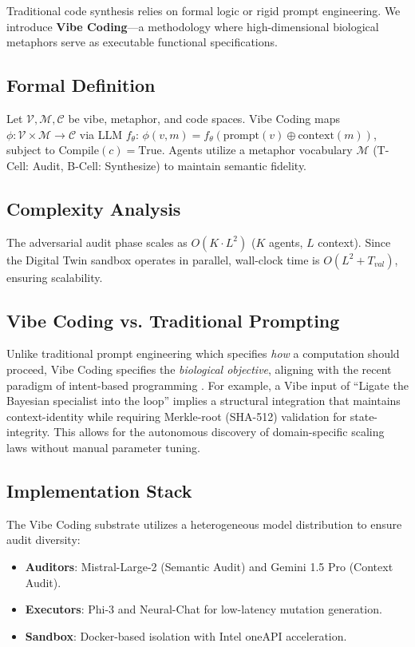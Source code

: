 Traditional code synthesis relies on formal logic or rigid prompt engineering. We introduce \textbf{Vibe Coding}---a methodology where high-dimensional biological metaphors serve as executable functional specifications.

\subsection{Formal Definition}
Let $\mathcal{V}, \mathcal{M}, \mathcal{C}$ be vibe, metaphor, and code spaces. Vibe Coding maps $\phi: \mathcal{V} \times \mathcal{M} \rightarrow \mathcal{C}$ via LLM $f_{\theta}$: $\phi(v, m) = f_{\theta}(\text{prompt}(v) \oplus \text{context}(m))$, subject to $\text{Compile}(c) = \text{True}$. Agents utilize a metaphor vocabulary $\mathcal{M}$ (T-Cell: Audit, B-Cell: Synthesize) to maintain semantic fidelity.

\subsection{Complexity Analysis}
The adversarial audit phase scales as $O(K \cdot L^2)$ ($K$ agents, $L$ context). Since the Digital Twin sandbox operates in parallel, wall-clock time is $O(L^2 + T_{val})$, ensuring scalability.

\subsection{Vibe Coding vs. Traditional Prompting}
Unlike traditional prompt engineering which specifies \textit{how} a computation should proceed, Vibe Coding specifies the \textit{biological objective}, aligning with the recent paradigm of intent-based programming \cite{karpathy2025vibecoding, sorensen2024vibe}. For example, a Vibe input of ``Ligate the Bayesian specialist into the loop'' implies a structural integration that maintains context-identity while requiring Merkle-root (SHA-512) validation for state-integrity. This allows for the autonomous discovery of domain-specific scaling laws \cite{lewis2022scaling} without manual parameter tuning.

\subsection{Implementation Stack}
The Vibe Coding substrate utilizes a heterogeneous model distribution to ensure audit diversity:
\begin{itemize}
    \item \textbf{Auditors}: Mistral-Large-2 (Semantic Audit) and Gemini 1.5 Pro (Context Audit).
    \item \textbf{Executors}: Phi-3 and Neural-Chat for low-latency mutation generation.
    \item \textbf{Sandbox}: Docker-based isolation with Intel oneAPI acceleration.
\end{itemize}
